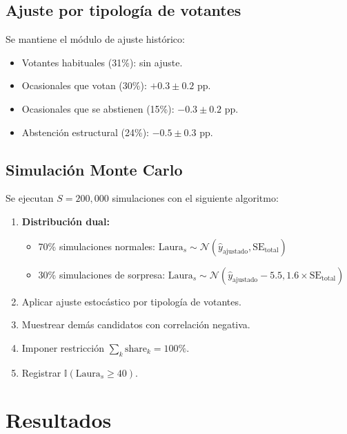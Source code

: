 \documentclass[11pt,a4paper]{article}
\begin{document}
\subsection{Ajuste por tipología de votantes}

Se mantiene el módulo de ajuste histórico:
\begin{itemize}
    \item Votantes habituales (31\%): sin ajuste.
    \item Ocasionales que votan (30\%): $+0.3 \pm 0.2$ pp.
    \item Ocasionales que se abstienen (15\%): $-0.3 \pm 0.2$ pp.
    \item Abstención estructural (24\%): $-0.5 \pm 0.3$ pp.
\end{itemize}

\subsection{Simulación Monte Carlo}

Se ejecutan $S = 200,000$ simulaciones con el siguiente algoritmo:

\begin{enumerate}
    \item \textbf{Distribución dual:}
    \begin{itemize}
        \item 70\% simulaciones normales: $\text{Laura}_s \sim \mathcal{N}(\hat{y}_{\text{ajustado}}, \text{SE}_{\text{total}})$
        \item 30\% simulaciones de sorpresa: $\text{Laura}_s \sim \mathcal{N}(\hat{y}_{\text{ajustado}} - 5.5, 1.6 \times \text{SE}_{\text{total}})$
    \end{itemize}
    \item Aplicar ajuste estocástico por tipología de votantes.
    \item Muestrear demás candidatos con correlación negativa.
    \item Imponer restricción $\sum_k \text{share}_k = 100\%$.
    \item Registrar $\mathbb{I}(\text{Laura}_s \geq 40)$.
\end{enumerate}

\section{Resultados}
\end{document}
